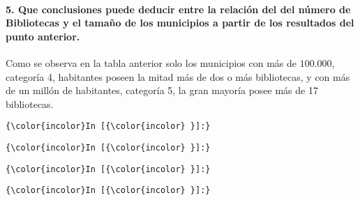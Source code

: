 \documentclass[11pt]{article}
\begin{document}
    \hypertarget{que-conclusiones-puede-deducir-entre-la-relaciuxf3n-del-del-nuxfamero-de-bibliotecas-y-el-tamauxf1o-de-los-municipios-a-partir-de-los-resultados-del-punto-anterior.}{%
\paragraph{5. Que conclusiones puede deducir entre la relación del del
número de Bibliotecas y el tamaño de los municipios a partir de los
resultados del punto
anterior.}\label{que-conclusiones-puede-deducir-entre-la-relaciuxf3n-del-del-nuxfamero-de-bibliotecas-y-el-tamauxf1o-de-los-municipios-a-partir-de-los-resultados-del-punto-anterior.}}

Como se observa en la tabla anterior solo los municipios con más de
\(100.000\), categoría 4, habitantes poseen la mitad más de dos o más
bibliotecas, y con más de un millón de habitantes, categoría 5, la gran
mayoría posee más de 17 bibliotecas.

    \begin{Verbatim}[commandchars=\\\{\}]
{\color{incolor}In [{\color{incolor} }]:} 
\end{Verbatim}

    \begin{Verbatim}[commandchars=\\\{\}]
{\color{incolor}In [{\color{incolor} }]:} 
\end{Verbatim}

    \begin{Verbatim}[commandchars=\\\{\}]
{\color{incolor}In [{\color{incolor} }]:} 
\end{Verbatim}

    \begin{Verbatim}[commandchars=\\\{\}]
{\color{incolor}In [{\color{incolor} }]:} 
\end{Verbatim}


    
    
    
    
\end{document}
